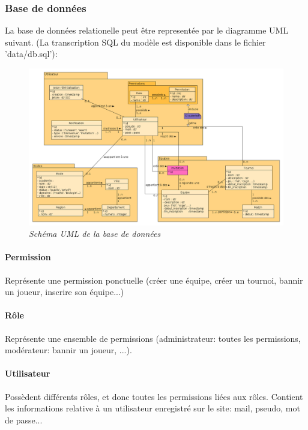 \documentclass[10pt]{article}
\begin{document}
      \subsubsection{Base de données}
	La base de données relationelle peut être representée par le diagramme UML suivant.
	\newline
	(La transcription SQL du modèle est disponible dans le fichier 'data/db.sql'):
	\begin{figure}[H]
	  \begin{center}
	    \includegraphics[width=16.0cm,keepaspectratio]{./images/uml.png}
	  \end{center}
	  \caption{\textit{Schéma UML de la base de données}}
	  \label{uml}
	\end{figure}
      
	\paragraph{Permission} Représente une permission ponctuelle (créer une équipe, créer un tournoi, bannir un joueur, inscrire son équipe...)
	\paragraph{Rôle} Représente une ensemble de permissions (administrateur: toutes les permissions, modérateur: bannir un joueur, ...).
	\paragraph{Utilisateur} Possèdent différents rôles, et donc toutes les permissions liées aux rôles.
	Contient les informations relative à un utilisateur enregistré sur le site: mail, pseudo, mot de passe...
	
\end{document}
